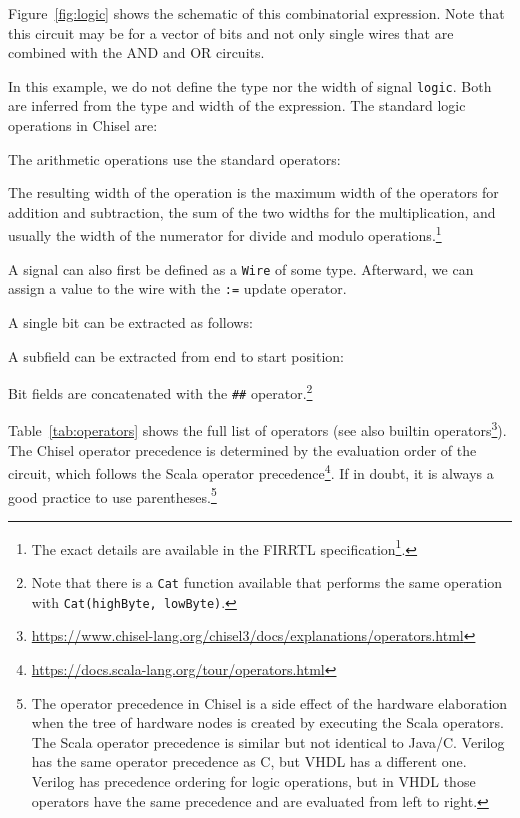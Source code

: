 \documentclass[%
    10pt,
    headinclude, footexclude,
    openright, %
    notitlepage,
    cleardoubleempty,
    headsepline,
    pointlessnumbers,
    bibtotoc, idxtotoc,
    ]{scrbook}
\newcommand{\code}[1]{{\small{\texttt{#1}}}}
\newcommand{\codefoot}[1]{{\footnotesize{\texttt{#1}}}}
\newcommand{\myref}[2]{\href{#1}{#2}}
\renewcommand{\myref}[2]{{#2}{\footnote{\url{#1}}}}
\begin{document}
\noindent Figure~\ref{fig:logic} shows the schematic of this combinatorial expression.
Note that this circuit may be for a vector of bits and not only single wires
that are combined with the AND and OR circuits.

In this example, we do not define the type nor the width of signal \code{logic}.
Both are inferred from the type and width of the expression.
The standard logic operations in Chisel are:



\noindent The arithmetic operations use the standard operators:



\noindent The resulting width of the operation is the maximum width of the operators for
addition and subtraction, the sum of the two widths for the multiplication, and usually
the width of the numerator for divide and modulo operations.\footnote{The exact
details are available in the \myref{https://github.com/chipsalliance/firrtl-spec/releases/latest/download/spec.pdf}{FIRRTL specification}.}

A signal can also first be defined as a \code{Wire} of some type. Afterward, we can assign a
value to the wire with the \code{:=} update operator.


A single bit can be extracted as follows:

\noindent A subfield can be extracted from end to start position:

\noindent Bit fields are concatenated with the \code{\#\#} operator.\footnote{Note that there is a \codefoot{Cat} function available that performs the same
operation with \codefoot{Cat(highByte, lowByte)}.}


Table~\ref{tab:operators} shows the full list of operators
(see also \myref{https://www.chisel-lang.org/chisel3/docs/explanations/operators.html}{builtin operators}).
The Chisel operator precedence is determined by the evaluation order of the circuit,
which follows the \myref{https://docs.scala-lang.org/tour/operators.html}{Scala operator precedence}.
If in doubt, it is always a good practice to use parentheses.\footnote{The operator precedence in
Chisel is a side effect of the hardware elaboration when the tree of hardware nodes
is created by executing the Scala operators. The Scala operator precedence is similar but
not identical to Java/C. Verilog has the same operator precedence as C, but VHDL
has a different one. Verilog has precedence ordering for logic operations, but in VHDL
those operators have the same precedence and are evaluated from left to right.}
\end{document}
